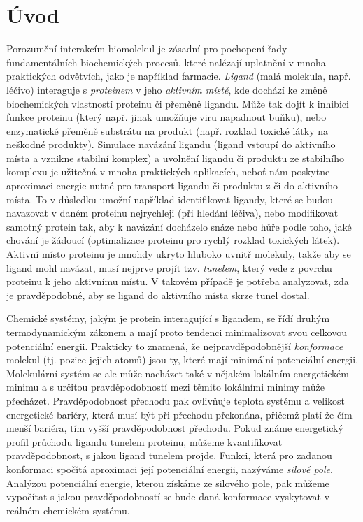 \chapter*{Úvod}

Porozumění interakcím biomolekul je
zásadní pro pochopení řady fundamentálních biochemických procesů, které
nalézají uplatnění v mnoha praktických odvětvích, jako je například farmacie.
\textit{Ligand} (malá molekula, např. léčivo) interaguje s \textit{proteinem}
v jeho \textit{aktivním místě}, kde dochází ke změně biochemických vlastností proteinu
či přeměně ligandu. Může tak dojít k inhibici funkce proteinu (který např.
jinak umožňuje viru napadnout buňku), nebo enzymatické přeměně substrátu na produkt
(např. rozklad toxické látky na neškodné produkty).
Simulace navázání ligandu (ligand vstoupí
do aktivního místa a vznikne stabilní komplex) a uvolnění ligandu či produktu ze stabilního komplexu
je užitečná v mnoha praktických
aplikacích, neboť nám poskytne aproximaci energie nutné pro transport ligandu či produktu z či do aktivního místa.
To v důsledku umožní například identifikovat ligandy, které se budou navazovat
v daném proteinu nejrychleji (při hledání léčiva), nebo modifikovat samotný protein tak,
aby k navázání docházelo snáze nebo hůře podle toho, jaké chování je žádoucí (optimalizace
proteinu pro rychlý rozklad toxických látek). Aktivní
místo proteinu je mnohdy ukryto hluboko uvnitř molekuly, takže aby se ligand
mohl navázat, musí nejprve projít tzv. \textit{tunelem}, který vede z povrchu proteinu
k jeho aktivnímu místu. V takovém případě je potřeba analyzovat, zda je
pravděpodobné, aby se ligand do aktivního místa skrze tunel dostal.

Chemické systémy, jakým je protein interagující s ligandem, se řídí druhým
termodynamickým zákonem a mají proto tendenci minimalizovat svou
celkovou potenciální energii. Prakticky to znamená, že nejpravděpodobnější
\textit{konformace} molekul (tj. pozice jejich atomů) jsou ty, které mají minimální
potenciální energii. Molekulární systém se ale může nacházet také v nějakém
lokálním energetickém minimu a s určitou pravděpodobností mezi těmito lokálními
minimy může přecházet. Pravděpodobnost přechodu pak ovlivňuje teplota systému a
velikost energetické bariéry, která musí být při přechodu překonána, přičemž platí
že čím menší bariéra, tím vyšší pravděpodobnost přechodu. Pokud známe
energetický profil průchodu ligandu tunelem proteinu, můžeme kvantifikovat
pravděpodobnost, s jakou ligand tunelem projde. Funkci, která pro zadanou konformaci
spočítá aproximaci její potenciální energii, nazýváme \textit{silové pole}. Analýzou
potenciální energie, kterou získáme ze silového pole, pak můžeme vypočítat
s jakou pravděpodobností se bude daná konformace vyskytovat v reálném chemickém
systému.

